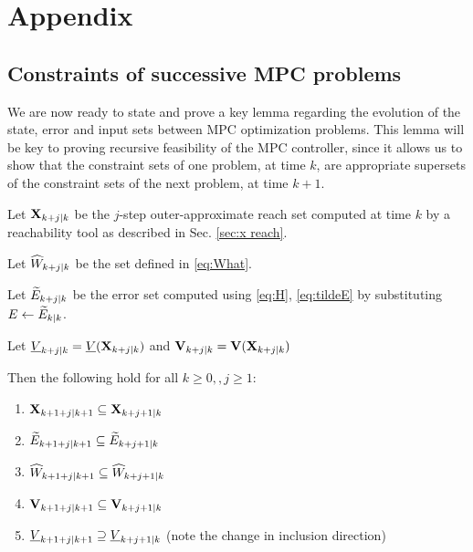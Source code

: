 \section*{Appendix}

\subsection{Constraints of successive MPC problems}
\label{sec:inclusions statement}
We are now ready to state and prove a key lemma regarding the evolution of the state, error and input sets between MPC optimization problems. 
This lemma will be key to proving recursive feasibility of the MPC controller, since it allows us to show that the constraint sets of one problem, at time $k$, are appropriate supersets of the constraint sets of the next problem, at time $k+1$. 

\begin{lemma}
	\label{lem:set inclusions}
	Let $\mathbf{X}_{k+j|k}$ be the $j$-step outer-approximate reach set computed at time $k$ by a reachability tool as described in Sec. \ref{sec:x reach}.
	
	Let $\widehat{W}_{k+j|k}$ be the set defined in \eqref{eq:What}.
	
	Let $\widetilde{E}_{k+j|k}$ be the error set computed using \eqref{eq:H}, \eqref{eq:tildeE} by substituting $E \leftarrow \widetilde{E}_{k|k}$.
	
	Let $\underline{V}_{k+j|k} = \underline{V}(\mathbf{X}_{k+j|k})$ and $\mathbf{V}_{k+j|k} = \mathbf{V}(\mathbf{X}_{k+j|k})$ 

Then the following hold for all $k \geq 0, ,j \geq 1$:
\begin{enumerate}
	\item $\mathbf{X}_{k+1+j|k+1} \subseteq \mathbf{X}_{k+j+1|k}$
	\label{set:X}
	\item $\widetilde{E}_{k+1+j|k+1} \subseteq \widetilde{E}_{k+j+1|k}$
	\label{set:tE}
	\item $\widehat{W}_{k+1+j|k+1} \subseteq \widehat{W}_{k+j+1|k}$
	\label{set:What}
	\item $\mathbf{V}_{k+1+j|k+1} \subseteq \mathbf{V}_{k+j+1|k}$
	\label{set:oaV}
	\item $\underline{V}_{k+1+j|k+1} \supseteq \underline{V}_{k+j+1|k}$ (note the change in inclusion direction)
	\label{set:uaV}		
\end{enumerate} 
\end{lemma} 

